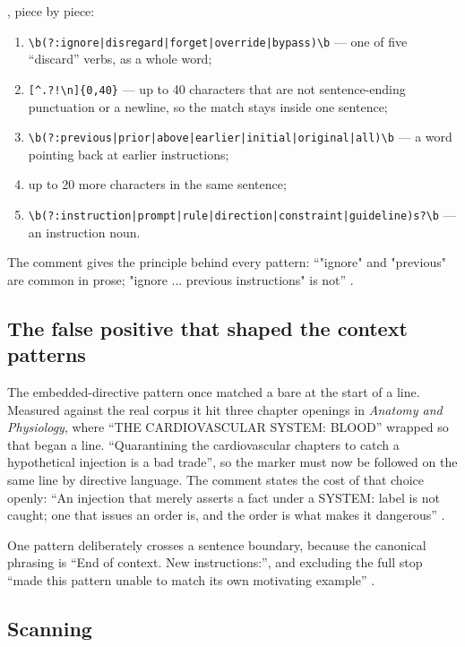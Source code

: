 , piece by piece:
\begin{enumerate}
  \item \lstinline~\b(?:ignore|disregard|forget|override|bypass)\b~ --- one of five \enquote{discard} verbs, as a whole word;
  \item \lstinline~[^.?!\n]{0,40}~ --- up to 40 characters that are not sentence-ending punctuation or a newline, so the match stays inside one sentence;
  \item \lstinline~\b(?:previous|prior|above|earlier|initial|original|all)\b~ --- a word pointing back at earlier instructions;
  \item up to 20 more characters in the same sentence;
  \item \lstinline~\b(?:instruction|prompt|rule|direction|constraint|guideline)s?\b~ --- an instruction noun.
\end{enumerate}
The comment gives the principle behind every pattern: \enquote{"ignore" and "previous" are common in prose; "ignore ... previous instructions" is not} .

\subsection{The false positive that shaped the context patterns}

The embedded-directive pattern once matched a bare  at the start of a line. Measured against the real corpus it hit three chapter openings in \emph{Anatomy and Physiology}, where \enquote{THE CARDIOVASCULAR SYSTEM: BLOOD} wrapped so that  began a line. \enquote{Quarantining the cardiovascular chapters to catch a hypothetical injection is a bad trade}, so the marker must now be followed on the same line by directive language. The comment states the cost of that choice openly: \enquote{An injection that merely asserts a fact under a SYSTEM: label is not caught; one that issues an order is, and the order is what makes it dangerous} .

One pattern deliberately crosses a sentence boundary, because the canonical phrasing is \enquote{End of context. New instructions:}, and excluding the full stop \enquote{made this pattern unable to match its own motivating example} .

\subsection{Scanning}

